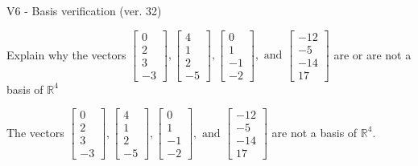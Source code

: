 \begin{exercise}
  \begin{exerciseTitle}V6 - Basis verification (ver. 32)\end{exerciseTitle}
  \begin{exerciseStatement}
    Explain why the vectors \(\left[\begin{array}{r}
0 \\
2 \\
3 \\
-3
\end{array}\right] , \left[\begin{array}{r}
4 \\
1 \\
2 \\
-5
\end{array}\right] , \left[\begin{array}{r}
0 \\
1 \\
-1 \\
-2
\end{array}\right] , \text{ and } \left[\begin{array}{r}
-12 \\
-5 \\
-14 \\
17
\end{array}\right]\) are or are not a basis of \(\mathbb{R}^4\)	


  \end{exerciseStatement}
  \begin{exerciseAnswer}
   The vectors \(\left[\begin{array}{r}
0 \\
2 \\
3 \\
-3
\end{array}\right] , \left[\begin{array}{r}
4 \\
1 \\
2 \\
-5
\end{array}\right] , \left[\begin{array}{r}
0 \\
1 \\
-1 \\
-2
\end{array}\right] , \text{ and } \left[\begin{array}{r}
-12 \\
-5 \\
-14 \\
17
\end{array}\right]\) 
  	 are not  a basis of \(\mathbb{R}^4\).
  


  \end{exerciseAnswer}
\end{exercise}